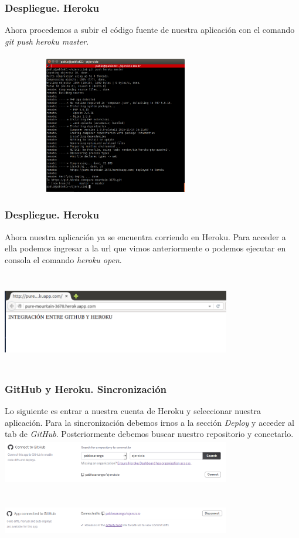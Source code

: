 \documentclass{beamer}
\begin{document}
\begin{frame}
\frametitle{Despliegue. Heroku}
Ahora procedemos a subir el código fuente de nuestra aplicación con el comando \textit{git push heroku master}.\\ \ \\
\centering
\includegraphics[width=10cm, height=6cm]{githubHeroku/19.png}
\end{frame}

\begin{frame}
\frametitle{Despliegue. Heroku}
Ahora nuestra aplicación ya se encuentra corriendo en Heroku. Para acceder a ella podemos ingresar a la url que vimos anteriormente o podemos ejecutar en consola el comando \textit{heroku open}.\\ \ \\
\centering
\includegraphics[width=10cm, height=4cm]{githubHeroku/27.png}
\end{frame}

\begin{frame}
\frametitle{GitHub y Heroku. Sincronización}
Lo siguiente es entrar a nuestra cuenta de Heroku y seleccionar nuestra aplicación. Para la sincronización debemos irnos a la sección \textit{Deploy} y acceder al tab de \textit{GitHub}. Posteriormente debemos buscar nuestro repositorio y conectarlo.\\
\centering
\includegraphics[width=10cm, height=2cm]{githubHeroku/15.png}
\\ \ \\
\includegraphics[width=10cm, height=2cm]{githubHeroku/16.png}
\end{frame}
\end{document}
